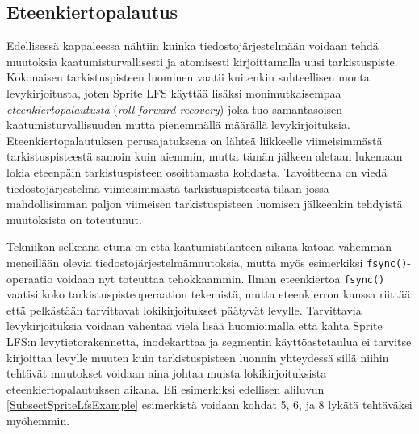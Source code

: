 \subsection{Eteenkiertopalautus}

Edellisessä kappaleessa nähtiin kuinka tiedostojärjestelmään voidaan tehdä muutoksia kaatumisturvallisesti ja atomisesti kirjoittamalla uusi tarkistuspiste.
Kokonaisen tarkistuspisteen luominen vaatii kuitenkin suhteellisen monta levykirjoitusta,
joten Sprite LFS käyttää lisäksi monimutkaisempaa \emph{eteenkiertopalautusta} (\emph{roll forward recovery}) joka tuo samantasoisen kaatumisturvallisuuden mutta pienemmällä määrällä levykirjoituksia.
Eteenkiertopalautuksen perusajatuksena on lähteä liikkeelle viimeisimmästä tarkistuspisteestä samoin kuin aiemmin,
mutta tämän jälkeen aletaan lukemaan lokia eteenpäin tarkistuspisteen osoittamasta kohdasta.
Tavoitteena on viedä tiedostojärjestelmä viimeisimmästä tarkistuspisteestä tilaan jossa mahdollisimman paljon viimeisen tarkistuspisteen luomisen jälkeenkin tehdyistä muutoksista on toteutunut.

Tekniikan selkeänä etuna on että kaatumistilanteen aikana katoaa vähemmän meneillään olevia tiedostojärjestelmämuutoksia,
mutta myös esimerkiksi \texttt{fsync()}-operaatio voidaan nyt toteuttaa tehokkaammin.
Ilman eteenkiertoa \texttt{fsync()} vaatisi koko tarkistuspisteoperaation tekemistä,
mutta eteenkierron kanssa riittää että pelkästään tarvittavat lokikirjoitukset päätyvät levylle.
Tarvittavia levykirjoituksia voidaan vähentää vielä lisää huomioimalla että kahta Sprite LFS:n levytietorakennetta,
inodekarttaa ja segmentin käyttöastetaulua ei tarvitse kirjoittaa levylle muuten kuin tarkistuspisteen luonnin yhteydessä
sillä niihin tehtävät muutokset voidaan aina johtaa muista lokikirjoituksista eteenkiertopalautuksen aikana.
Eli esimerkiksi edellisen aliluvun \ref{SubsectSpriteLfsExample} esimerkistä voidaan kohdat 5, 6, ja 8 lykätä tehtäväksi myöhemmin. 

